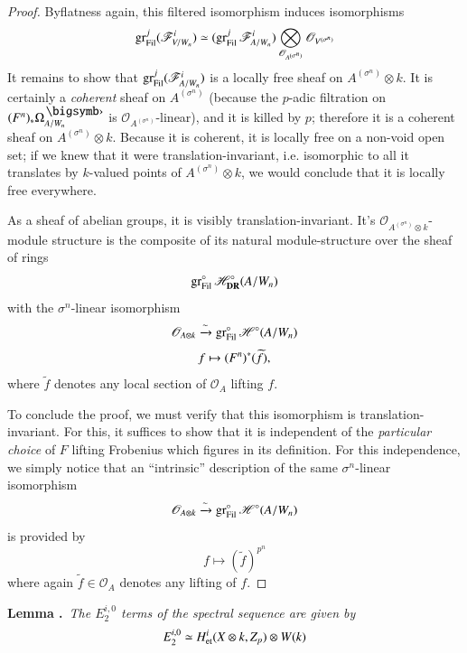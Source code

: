 \begin{proof}
By\pageoriginale flatness again, this filtered isomorphism induces isomorphisms
$$
\operatorname{gr}^{j}_{\operatorname{Fil}}(\mathscr{F}^{i}_{V/W_{n}})\simeq (\operatorname{gr}^{j}_{\operatorname{Fil}}\mathscr{F}^{i}_{A/W_{n}})\bigotimes\limits_{\mathscr{O}_{A^{(\sigma^{n})}}}\mathscr{O}_{V^{(\sigma^{n})}}
$$
It remains to show that $\operatorname{gr}^{j}_{\operatorname{Fil}}(\mathscr{F}^{i}_{A/W_{n}})$ is a locally free sheaf on $A^{(\sigma^{n})}\otimes k$. It is certainly a {\em coherent} sheaf on $A^{(\sigma^{n})}$ (because the $p$-adic filtration on $(F^{n})_{*}\Omega^{\bigdot}_{A/W_{n}}$ is $\mathscr{O}_{A^{(\sigma^{n})}}$-linear), and it is killed by $p$; therefore it is a coherent sheaf on $A^{(\sigma^{n})}\otimes k$. Because it is coherent, it is locally free on a non-void open set; if we knew that it were translation-invariant, i.e. isomorphic to all it translates by $k$-valued points of $A^{(\sigma^{n})}\otimes k$, we would conclude that it is locally free everywhere.

As a sheaf of abelian groups, it is visibly translation-invariant. It's $\mathscr{O}_{A^{(\sigma^{n})}\otimes k}$-module structure is the composite of its natural module-structure over the sheaf of rings
$$
\operatorname{gr}^{\circ}_{\operatorname{Fil}}\mathscr{H}^{\circ}_{\mathbf{DR}}(A/W_{n})
$$
with the $\sigma^{n}$-linear isomorphism
\begin{gather*}
\mathscr{O}_{A\otimes k}\xrightarrow{\sim} \operatorname{gr}^{\circ}_{\operatorname{Fil}}\mathscr{H}^{\circ}(A/W_{n})\\[3pt]
f\mapsto (F^{n})^{*}(\widetilde{f}),
\end{gather*}
where $\widetilde{f}$ denotes any local section of $\mathscr{O}_{A}$ lifting $f$.

To conclude the proof, we must verify that this isomorphism is translation-invariant. For this, it suffices to show that it is independent of the {\em particular choice} of $F$ lifting Frobenius which figures in its definition. For this independence, we simply notice that an ``intrinsic'' description of the same $\sigma^{n}$-linear isomorphism
$$
\mathscr{O}_{A\otimes k}\xrightarrow{\sim} \operatorname{gr}^{\circ}_{\operatorname{Fil}}\mathscr{H}^{\circ}(A/W_{n})
$$
is provided by
$$
f\mapsto (\widetilde{f})^{p^{n}}
$$
where again $\widetilde{f}\in \mathscr{O}_{A}$ denotes any lifting of $f$.
\end{proof}

\noindent
{\bf Lemma .\label{art6-lem8.2}}~{\em The $E^{i,0}_{2}$ terms of the spectral sequence are given by}
$$
E^{i,0}_{2}\simeq H^{i}_{\operatorname{et}}(X\otimes k,Z_{p})\otimes W(k)
$$

